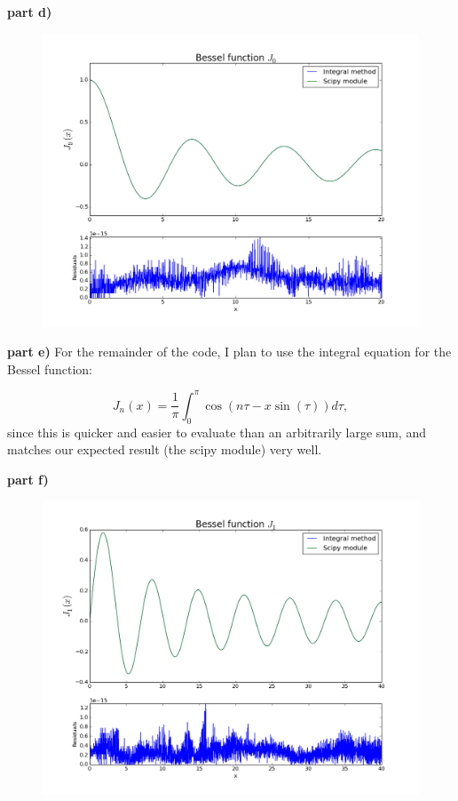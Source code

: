 \documentclass[a4paper,12pt]{article}
\begin{document}
\textbf{part d)}

\begin{figure}[H]
\centering
\includegraphics[width = \linewidth]{indepq2d.png}
\caption{}
\label{fig:q2d}
\end{figure}

\textbf{part e)} For the remainder of the code, I plan to use the integral equation for the Bessel function:

\begin{equation}
J_n(x) = \frac{1}{\pi}\int_0^{\pi}\cos(n\tau - x\sin(\tau)) d\tau,\nonumber
\end{equation} 
%
since this is quicker and easier to evaluate than an arbitrarily large sum, and matches our expected result (the scipy module) very well.

\textbf{part f)}

\begin{figure}[H]
\centering
\includegraphics[width = \linewidth]{indepq2f.png}
\caption{}
\label{fig:q2f}
\end{figure}
\end{document}
